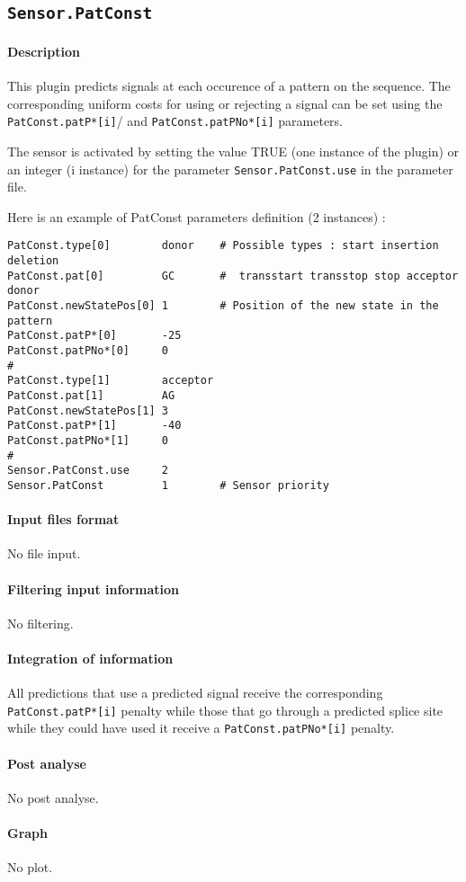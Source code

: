 
\subsection{\texttt{Sensor.PatConst}}

\paragraph{Description}

This plugin predicts signals at each occurence of a pattern on the
sequence. The corresponding uniform costs for using
or rejecting a signal can be set using the
\texttt{PatConst.patP*[i]}/ and \texttt{PatConst.patPNo*[i]} parameters.

The sensor is activated by setting the value TRUE (one instance of the
plugin) or an integer (i instance) for the parameter
\texttt{Sensor.PatConst.use} in the parameter file.

Here is an example of PatConst parameters definition (2 instances) :
\begin{Verbatim}[fontsize=\small]
PatConst.type[0]        donor    # Possible types : start insertion deletion
PatConst.pat[0]         GC       #  transstart transstop stop acceptor donor
PatConst.newStatePos[0] 1        # Position of the new state in the pattern
PatConst.patP*[0]       -25
PatConst.patPNo*[0]     0
#
PatConst.type[1]        acceptor
PatConst.pat[1]         AG   
PatConst.newStatePos[1] 3
PatConst.patP*[1]       -40
PatConst.patPNo*[1]     0
#
Sensor.PatConst.use     2
Sensor.PatConst         1        # Sensor priority
\end{Verbatim}

\paragraph{Input files format}

No file input.

\paragraph{Filtering input information}

No filtering.

\paragraph{Integration of information}

All predictions that use a predicted signal receive the
corresponding \texttt{PatConst.patP*[i]} penalty while those that go through
a predicted splice site while they could have used it receive a
\texttt{PatConst.patPNo*[i]} penalty.

\paragraph{Post analyse}

No post analyse.

\paragraph{Graph}

No plot.
